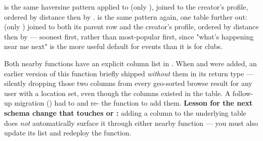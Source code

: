  is the same haversine pattern applied to  (only ), joined to the creator's profile, ordered by distance then by .  is the same pattern again, one table further out:  (only ) joined to both its parent  row and the creator's profile, ordered by distance then by  — soonest first, rather than most-popular first, since "what's happening near me next" is the more useful default for events than it is for clubs.

\begin{olkgotcha}
Both nearby functions have an explicit column list in . When  and  were added, an earlier version of this function briefly shipped \emph{without} them in its return type — silently dropping those two columns from every geo-sorted browse result for any user with a location set, even though the columns existed in the table. A follow-up migration () had to  and re- the function to add them. \textbf{Lesson for the next schema change that touches  or :} adding a column to the underlying table does \emph{not} automatically surface it through either nearby function — you must also update its  list and redeploy the function.
\end{olkgotcha}


